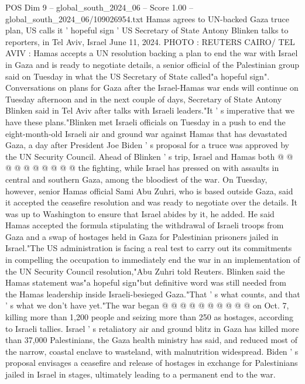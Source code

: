 \begin{textsample}{POS Dim 9 – global\_south\_2024\_06 – Score 1.00 – global\_south\_2024\_06/109026954.txt}  \label{ex:f9_pos_060}
Hamas agrees to UN-backed Gaza truce plan, US calls it ' hopeful sign ' US Secretary of State Antony Blinken talks to reporters, in Tel Aviv, Israel June 11, 2024.
PHOTO : REUTERS CAIRO/ TEL AVIV : Hamas accepts a UN resolution backing a plan to end the war with Israel in Gaza and is ready to negotiate details, a senior official of the Palestinian group said on Tuesday in what the US Secretary of State called"a hopeful sign".
Conversations on plans for Gaza after the Israel-Hamas war ends will continue on Tuesday afternoon and in the next couple of days, Secretary of State Antony Blinken said in Tel Aviv after talks with Israeli leaders."It ' s imperative that we have these plans."Blinken met Israeli officials on Tuesday in a push to end the eight-month-old Israeli air and ground war against Hamas that has devastated Gaza, a day after President Joe Biden ' s proposal for a truce was approved by the UN Security Council.
Ahead of Blinken ' s trip, Israel and Hamas both @ @ @ @ @ @ @ @ @ @ the fighting, while Israel has pressed on with assaults in central and southern Gaza, among the bloodiest of the war.
On Tuesday, however, senior Hamas official Sami Abu Zuhri, who is based outside Gaza, said it accepted the ceasefire resolution and was ready to negotiate over the details.
It was up to Washington to ensure that Israel abides by it, he added.
He said Hamas accepted the formula stipulating the withdrawal of Israeli troops from Gaza and a swap of hostages held in Gaza for Palestinian prisoners jailed in Israel."The US administration is facing a real test to carry out its commitments in compelling the occupation to immediately end the war in an implementation of the UN Security Council resolution,"Abu Zuhri told Reuters.
Blinken said the Hamas statement was"a hopeful sign"but definitive word was still needed from the Hamas leadership inside Israeli-besieged Gaza."That ' s what counts, and that ' s what we don't have yet."The war began @ @ @ @ @ @ @ @ @ @ on Oct. 7, killing more than 1,200 people and seizing more than 250 as hostages, according to Israeli tallies.
Israel ' s retaliatory air and ground blitz in Gaza has killed more than 37,000 Palestinians, the Gaza health ministry has said, and reduced most of the narrow, coastal enclave to wasteland, with malnutrition widespread.
Biden ' s proposal envisages a ceasefire and release of hostages in exchange for Palestinians jailed in Israel in stages, ultimately leading to a permanent end to the war.

\end{textsample}
